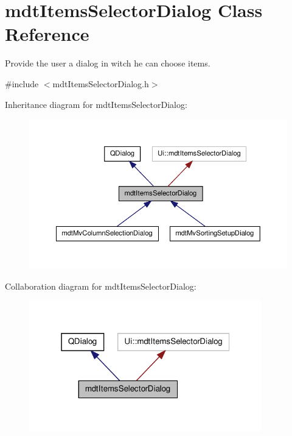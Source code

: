 \hypertarget{classmdt_items_selector_dialog}{\section{mdt\-Items\-Selector\-Dialog Class Reference}
\label{classmdt_items_selector_dialog}
}


Provide the user a dialog in witch he can choose items.  




{\ttfamily \#include $<$mdt\-Items\-Selector\-Dialog.\-h$>$}



Inheritance diagram for mdt\-Items\-Selector\-Dialog\-:
\nopagebreak
\begin{figure}[H]
\begin{center}
\leavevmode
\includegraphics[width=350pt]{classmdt_items_selector_dialog__inherit__graph}
\end{center}
\end{figure}


Collaboration diagram for mdt\-Items\-Selector\-Dialog\-:
\nopagebreak
\begin{figure}[H]
\begin{center}
\leavevmode
\includegraphics[width=286pt]{classmdt_items_selector_dialog__coll__graph}
\end{center}
\end{figure}
